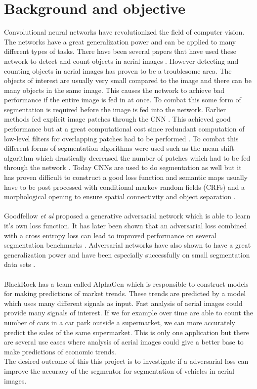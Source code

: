 \documentclass[a4paper,11pt]{article}
\begin{document}
\section{Background and objective}
Convolutional neural networks have revolutionized the field of computer vision. The networks have a great generalization power and can be applied to many different types of tasks. There have been several papers that have used these network to detect and count objects in aerial images \cite{audebert_segment-before-detect:_2017, holt_object-based_2009, zhong_robust_2017}. However detecting and counting objects in aerial images has proven to be a troublesome area. The objects of interest are usually very small compared to the image and there can be many objects in the same image. This causes the network to achieve bad performance if the entire image is fed in at once. To combat this some form of segmentation is required before the image is fed into the network. Earlier methods fed explicit image patches through the CNN \cite{holt_object-based_2009}. This achieved good performance but at a great computational cost since redundant computation of low-level filters for overlapping patches had to be performed \cite{luc_semantic_2016}. To combat this different forms of segmentation algorithms were used such as the mean-shift-algorithm which drastically decreased the number of patches which had to be fed through the network \cite{ammour_deep_2017}. Today CNNs are used to do segmentation as well but it has proven difficult to construct a good loss function and semantic maps usually have to be post processed with conditional markov random fields (CRFs) and a morphological opening to ensure spatial connectivity \cite{luc_semantic_2016} and object separation \cite{audebert_segment-before-detect:_2017}.\\
\\
Goodfellow \textit{et al} \cite{goodfellow_nips_2016} proposed a generative adversarial network which is able to learn it's own loss function. It has later been shown that an adversarial loss combined with a cross entropy loss can lead to improved performance on several segmentation benchmarks \cite{luc_semantic_2016}. Adversarial networks have also shown to have a great generalization power and have been especially successfully on small segmentation data sets \cite{son_retinal_2017, arbelle_microscopy_2017}.\\
\\
BlackRock has a team called AlphaGen which is responsible to construct models for making predictions of market trends. These trends are predicted by a model which uses many different signals as input. Fast analysis of aerial images could provide many signals of interest. If we for example  over time are able to count the number of cars in a car park outside a supermarket, we can more accurately predict the sales of the same supermarket. This is only one application but there are several use cases where analysis of aerial images could give a better base to make predictions of economic trends.\\
The desired outcome of this this project is to investigate if a adversarial loss can improve the accuracy of the segmentor for segmentation of vehicles in aerial images.
\end{document}
